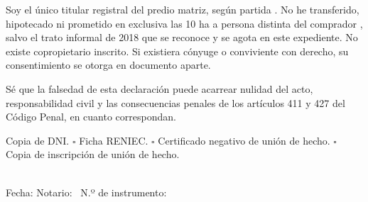 \documentclass[12pt,a4paper]{article}
\begin{document}
Soy el único titular registral del predio matriz, según partida \PartidaMatriz. No he transferido, hipotecado ni prometido en exclusiva las 10 ha a persona distinta del comprador \CompradorNombreCompleto, salvo el trato informal de 2018 que se reconoce y se agota en este expediente. No existe copropietario inscrito. Si existiera cónyuge o conviviente con derecho, su consentimiento se otorga en documento aparte.

Sé que la falsedad de esta declaración puede acarrear nulidad del acto, responsabilidad civil y las consecuencias penales de los artículos 411 y 427 del Código Penal, en cuanto correspondan.

Copia de DNI. $\square$ Ficha RENIEC. $\square$ Certificado negativo de unión de hecho. $\square$ Copia de inscripción de unión de hecho.

\LugarFecha

\noindent
{}
\hfill
{}

\vspace{0.8em}
\\
{\small Fecha: \linea[3cm] \quad Notario: \NotarioNombre\ \quad N.º de instrumento: \linea[3.2cm]}\\[0.3em]
\noindent{}
\end{document}
